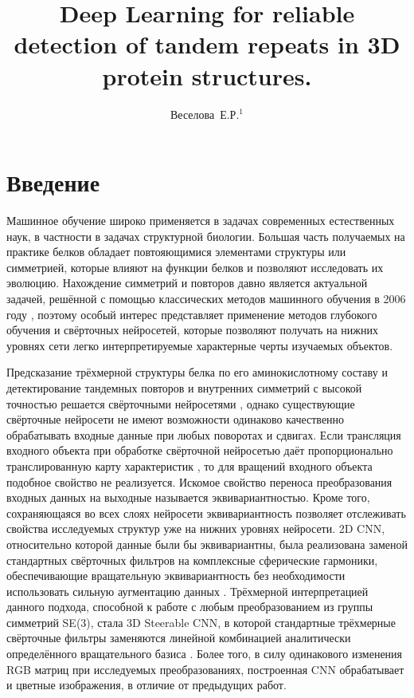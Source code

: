 \documentclass[12pt,twosides]{article}
\title
[Detection of tandem repeats in proteins]
{Deep Learning for reliable detection of tandem repeats in 3D protein structures.}
\author
[Веселова~Е.Р.] 
{Веселова~Е.Р.$^1$}
\begin{document}
	\maketitle
	
	\section{Введение}
	Машинное обучение широко применяется в задачах современных естественных наук, в частности в задачах структурной биологии. Большая часть получаемых на практике белков обладает повтояющимися элементами структуры или симметрией, которые влияют на функции белков и позволяют исследовать их эволюцию. Нахождение симметрий и повторов давно является актуальной задачей, решённой с помощью классических методов машинного обучения в 2006 году \cite{MitGuiPau06}, поэтому особый интерес представляет применение методов глубокого обучения и свёрточных нейросетей, которые позволяют получать на нижних уровнях сети легко интерпретируемые характерные черты изучаемых объектов. 
	
	Предсказание трёхмерной структуры белка по его аминокислотному составу \cite{BioCNN18} и детектирование тандемных повторов и внутренних симметрий с высокой точностью решается свёрточными нейросетями \cite{DeepSymmetry18}, однако существующие свёрточные нейросети не имеют возможности одинаково качественно обрабатывать входные данные при любых поворотах и сдвигах. Если трансляция входного объекта при обработке свёрточной нейросетью даёт пропорционально транслированную карту характеристик \cite{Lenc18}, то для вращений входного объекта подобное свойство не реализуется. Искомое свойство переноса преобразования входных данных на выходные называется эквивариантностью. Кроме того, сохраняющаяся во всех слоях нейросети эквивариантность позволяет отслеживать свойства исследуемых структур уже на нижних уровнях нейросети. 2D CNN, относительно которой данные были бы эквивариантны, была реализована заменой стандартных свёрточных фильтров на комплексные сферические гармоники, обеспечивающие вращательную эквивариантность без необходимости использовать сильную аугментацию данных \cite{conf/cvpr/WorrallGTB17}. Трёхмерной интерпретацией данного подхода, способной к работе с любым преобразованием из группы симметрий SE(3), стала 3D Steerable CNN, в которой стандартные трёхмерные свёрточные фильтры заменяются линейной комбинацией аналитически определённого вращательного базиса \cite{DBLP:journals/corr/abs-1807-02547}. Более того, в силу одинакового изменения RGB матриц при исследуемых преобразованиях, построенная CNN обрабатывает и цветные изображения, в отличие от предыдущих работ.
	
\end{document}
